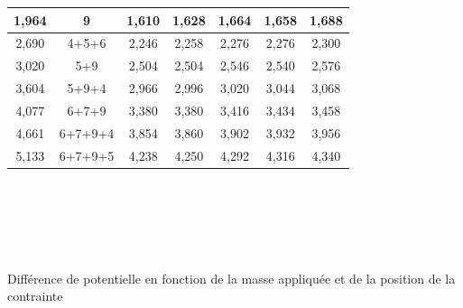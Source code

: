 \documentclass[11pt,a4paper]{report}
\begin{document}
\begin{center}
\begin{tabular}{|c|c|c|c|c|c|c|}
{\color[HTML]{963400} 1,964}                            & {\color[HTML]{963400} 9}                         & {\color[HTML]{036400} 1,610}    & {\color[HTML]{036400} 1,628}    & {\color[HTML]{036400} 1,664}    & {\color[HTML]{036400} 1,658}    & {\color[HTML]{036400} 1,688}    \\ \hline
{\color[HTML]{963400} 2,690}                            & {\color[HTML]{963400} 4+5+6}                     & {\color[HTML]{036400} 2,246}    & {\color[HTML]{036400} 2,258}    & {\color[HTML]{036400} 2,276}    & {\color[HTML]{036400} 2,276}    & {\color[HTML]{036400} 2,300}    \\ \hline
{\color[HTML]{963400} 3,020}                            & {\color[HTML]{963400} 5+9}                       & {\color[HTML]{036400} 2,504}    & {\color[HTML]{036400} 2,504}    & {\color[HTML]{036400} 2,546}    & {\color[HTML]{036400} 2,540}    & {\color[HTML]{036400} 2,576}    \\ \hline
{\color[HTML]{963400} 3,604}                            & {\color[HTML]{963400} 5+9+4}                     & {\color[HTML]{036400} 2,966}    & {\color[HTML]{036400} 2,996}    & {\color[HTML]{036400} 3,020}    & {\color[HTML]{036400} 3,044}    & {\color[HTML]{036400} 3,068}    \\ \hline
{\color[HTML]{963400} 4,077}                            & {\color[HTML]{963400} 6+7+9}                     & {\color[HTML]{036400} 3,380}    & {\color[HTML]{036400} 3,380}    & {\color[HTML]{036400} 3,416}    & {\color[HTML]{036400} 3,434}    & {\color[HTML]{036400} 3,458}    \\ \hline
{\color[HTML]{963400} 4,661}                            & {\color[HTML]{963400} 6+7+9+4}                   & {\color[HTML]{036400} 3,854}    & {\color[HTML]{036400} 3,860}    & {\color[HTML]{036400} 3,902}    & {\color[HTML]{036400} 3,932}    & {\color[HTML]{036400} 3,956}    \\ \hline
{\color[HTML]{963400} 5,133}                            & {\color[HTML]{963400} 6+7+9+5}                   & {\color[HTML]{036400} 4,238}    & {\color[HTML]{036400} 4,250}    & {\color[HTML]{036400} 4,292}    & {\color[HTML]{036400} 4,316}    & {\color[HTML]{036400} 4,340}    \\ \hline
\end{tabular}
~\\~\\~\\~\\~\\
Différence de potentielle en fonction de la masse appliquée et de la position de la contrainte~\\

\end{center}
\end{document}
